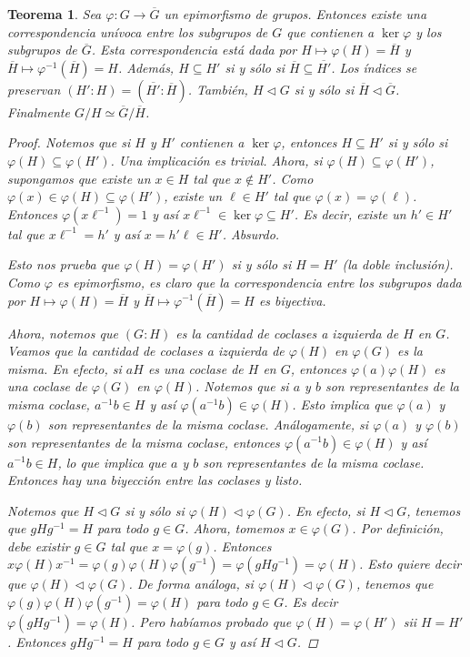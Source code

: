 \documentclass[12pt]{book}
\newtheorem{teo}{Teorema}[section]
\theoremstyle{definition}
\begin{document}
\begin{teo}
Sea $\varphi :G\to \overline{G}$ un epimorfismo de grupos. Entonces existe una correspondencia unívoca entre los subgrupos de $G$ que contienen a $\ker \varphi$ y los subgrupos de $\overline{G}$. Esta correspondencia está dada por $H\mapsto \varphi(H)=\overline{H}$ y $\overline{H}\mapsto \varphi^{-1}(\overline{H})=H$. Además, $H\subseteq H'$ si y sólo si $\overline{H}\subseteq \overline{H'}$. Los índices se preservan $(H':H) = (\overline{H'}:\overline{H})$. También, $H\triangleleft G$ si y sólo si $\overline{H}\triangleleft\overline{G}$. Finalmente $G/H \simeq \overline{G}/\overline{H}$.
\begin{proof}

Notemos que si $H$ y $H'$ contienen a $\ker \varphi$, entonces $H\subseteq H'$ si y sólo si $\varphi(H)\subseteq \varphi(H')$. Una implicación es trivial. Ahora, si $\varphi (H)\subseteq \varphi(H')$, supongamos que existe un $x\in H$ tal que $x\notin H'$. Como $\varphi (x)\in \varphi(H)\subseteq \varphi (H')$, existe un $\ell\in H'$ tal que $\varphi (x) = \varphi(\ell)$. Entonces $\varphi(x\ell^{-1})=1$ y así $x\ell^{-1}\in \ker\varphi \subseteq H'$. Es decir, existe un $h'\in H'$ tal que $x\ell^{-1}=h'$ y así $x= h' \ell\in H'$. Absurdo.

Esto nos prueba que $\varphi(H)=\varphi(H')$ si y sólo si $H=H'$ (la doble inclusión). Como $\varphi$ es epimorfismo, es claro que la correspondencia entre los subgrupos dada por $H\mapsto\varphi(H)=\overline{H}$ y $\overline{H}\mapsto \varphi^{-1}(\overline{H}) = H$ es biyectiva.

Ahora, notemos que $(G:H)$ es la cantidad de coclases a izquierda de $H$ en $G$. Veamos que la cantidad de coclases a izquierda de $\varphi (H)$ en $\varphi (G)$ es la misma. En efecto, si $aH$ es una coclase de $H$ en $G$, entonces $\varphi(a)\varphi(H)$ es una coclase de $\varphi(G)$ en $\varphi (H)$. Notemos que si $a$ y $b$ son representantes de la misma coclase, $a^{-1}b\in H$ y así $\varphi(a^{-1}b)\in \varphi(H)$. Esto implica que $\varphi(a)$ y $\varphi(b)$ son representantes de la misma coclase. Análogamente, si $\varphi(a)$ y $\varphi(b)$ son representantes de la misma coclase, entonces $\varphi(a^{-1}b)\in \varphi(H)$ y así $a^{-1}b\in H$, lo que implica que $a$ y $b$ son representantes de la misma coclase. Entonces hay una biyección entre las coclases y listo.

Notemos que $H\triangleleft G$ si y sólo si $\varphi (H)\triangleleft \varphi (G)$. En efecto, si $H\triangleleft G$, tenemos que $gHg^{-1} = H$ para todo $g\in G$. Ahora, tomemos $x\in \varphi(G)$. Por definición, debe existir $g\in G$ tal que $x=\varphi(g)$. Entonces $x\varphi(H)x^{-1} = \varphi (g)\varphi(H) \varphi(g^{-1}) = \varphi(gHg^{-1}) = \varphi(H)$. Esto quiere decir que $\varphi (H) \triangleleft \varphi (G)$. De forma análoga, si $\varphi(H)\triangleleft \varphi(G)$, tenemos que $\varphi(g)\varphi(H)\varphi(g^{-1}) = \varphi(H)$ para todo $g\in G$. Es decir $\varphi (gHg^{-1})=\varphi(H)$. Pero habíamos probado que $\varphi(H)=\varphi(H')$ sii $H=H'$. Entonces $gHg^{-1}=H$ para todo $g\in G$ y así $H\triangleleft G$.


\end{proof}
\end{teo}
\end{document}
